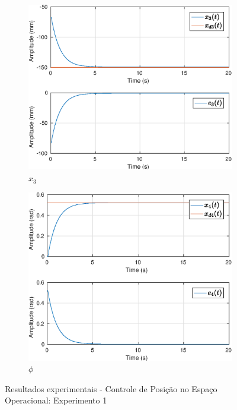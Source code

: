 \begin{figure}[H]
\begin{subfigure}{.5\textwidth}
  \centering
  \includegraphics[width=\linewidth]{./img/position1/x3.eps}
  \caption{$x_3$}
  \label{fig:oper_space_exp1_x3}
\end{subfigure}%
\begin{subfigure}{.5\textwidth}
  \centering
  \includegraphics[width=\linewidth]{./img/position1/x4.eps}
  \caption{$\phi$}
  \label{fig:oper_space_exp1_x4}
\end{subfigure}
\caption{Resultados experimentais - Controle de Posição no Espaço Operacional: Experimento 1}
\label{fig:oper_space_exp1}
\end{figure}

